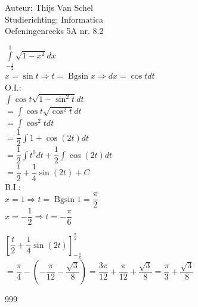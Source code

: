\documentclass[a4paper]{article}
\newcommand{\dint}{\displaystyle\int}
\newcommand{\Bgsin}{\operatorname{Bgsin}}
\begin{document}
  
\noindent \large Auteur: Thijs Van Schel \\
\noindent \large Studierichting: Informatica\\
\noindent \large Oefeningenreeks 5A nr. 8.2\\

\medskip

\normalsize

$\dint\limits_{-\tfrac{1}{2}}^{1} \sqrt{1-x^2}dx$\\

$x = \sin t \Rightarrow t = \Bgsin x \Rightarrow dx = \cos t dt$\\

O.I.:\\

$\dint \cos t \sqrt{1-\sin^2t}dt$\\

$= \dint \cos t \sqrt{\cos^2t}dt$\\

$= \dint \cos^2t dt$\\

$= \dfrac{1}{2}\dint 1 + \cos(2t)dt$\\

$= \dfrac{1}{2}\dint t^0 dt + \dfrac{1}{2}\dint \cos(2t)dt$\\

$= \dfrac{t}{2}+\dfrac{1}{4}\sin(2t)+C$\\

B.I.:\\

$x=1 \Rightarrow t = \Bgsin 1 = \dfrac{\pi}{2}$\\

$x=-\dfrac{1}{2}\Rightarrow t = -\dfrac{\pi}{6}$

$\left[\dfrac{t}{2}+\dfrac{1}{4}\sin(2t)\right]^{\tfrac{\pi}{2}}_{-\tfrac{\pi}{6}}$\\

$=\dfrac{\pi}{4}-\left(-\dfrac{\pi}{12}-\dfrac{\sqrt{3}}{8}\right) = \dfrac{3\pi}{12}+\dfrac{\pi}{12}+\dfrac{\sqrt{3}}{8} = \dfrac{\pi}{3}+ \dfrac{\sqrt{3}}{8}$

\begin{thebibliography}{999}
\end{thebibliography}
\end{document}

